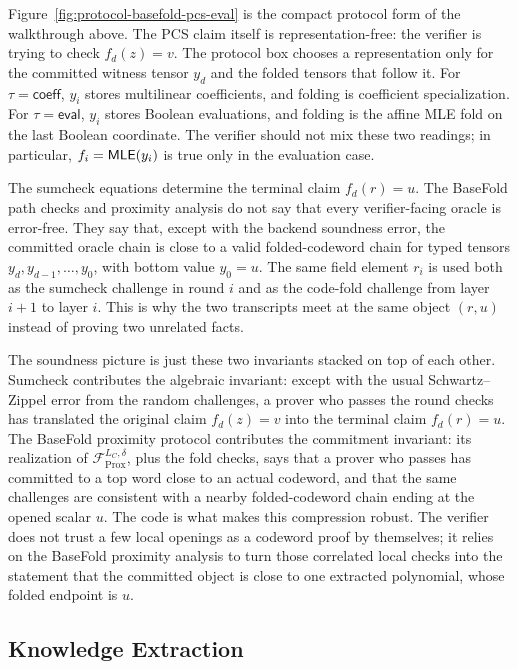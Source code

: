 Figure~\ref{fig:protocol-basefold-pcs-eval} is the compact protocol form of the
walkthrough above.  The PCS claim itself is representation-free: the verifier is
trying to check $f_d(z)=v$.  The protocol box chooses a representation only for
the committed witness tensor $y_d$ and the folded tensors that follow it.  For
$\tau=\mathsf{coeff}$, $y_i$ stores multilinear coefficients, and folding is
coefficient specialization.  For $\tau=\mathsf{eval}$, $y_i$ stores Boolean
evaluations, and folding is the affine MLE fold on the last Boolean coordinate.
The verifier should not mix these two readings; in particular,
$f_i=\mathsf{MLE}(y_i)$ is true only in the evaluation case.

The sumcheck equations determine the terminal claim $f_d(r)=u$.  The BaseFold
path checks and proximity analysis do not say that every verifier-facing oracle
is error-free.  They say that, except with the backend soundness error, the
committed oracle chain is close to a valid folded-codeword chain for typed
tensors $y_d,y_{d-1},\ldots,y_0$, with bottom value $y_0=u$.  The same field
element $r_i$ is used both as the sumcheck challenge in round $i$ and as the
code-fold challenge from layer $i+1$ to layer $i$.  This is why the two
transcripts meet at the same object $(r,u)$ instead of proving two unrelated
facts.

The soundness picture is just these two invariants stacked on top of each other.
Sumcheck contributes the algebraic invariant: except with the usual
Schwartz--Zippel error from the random challenges, a prover who passes the
round checks has translated the original claim $f_d(z)=v$ into the terminal
claim $f_d(r)=u$.  The BaseFold proximity protocol contributes the commitment
invariant: its realization of
\(\mathcal F_{\mathrm{Prox}}^{L_C,\delta}\), plus the fold checks, says that a
prover who passes has committed to a top word close to an actual codeword, and
that the same challenges are consistent with a nearby folded-codeword chain
ending at the opened scalar $u$.  The code is what makes this compression
robust.  The verifier does not trust a few local openings as a codeword proof by
themselves; it relies on the BaseFold proximity analysis to turn those
correlated local checks into the statement that the committed object is close to
one extracted polynomial, whose folded endpoint is $u$.

\subsection{Knowledge Extraction}

